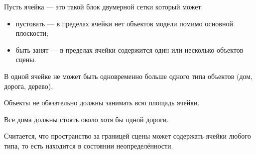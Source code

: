 Пусть ячейка --- это такой блок двумерной сетки который может:
\begin{itemize}
    \item пустовать --- в пределах ячейки нет объектов модели помимо основной плоскости;
    \item быть занят --- в пределах ячейки содержится один или несколько объектов сцены.
\end{itemize}

В одной ячейке не может быть одновременно больше одного типа объектов (дом, дорога, дерево).

Объекты не обязательно должны занимать всю площадь ячейки.

Все дома должны стоять около хотя бы одной дороги.

Считается, что пространство за границей сцены может содержать ячейки любого типа, то есть находится в состоянии неопределённости.
